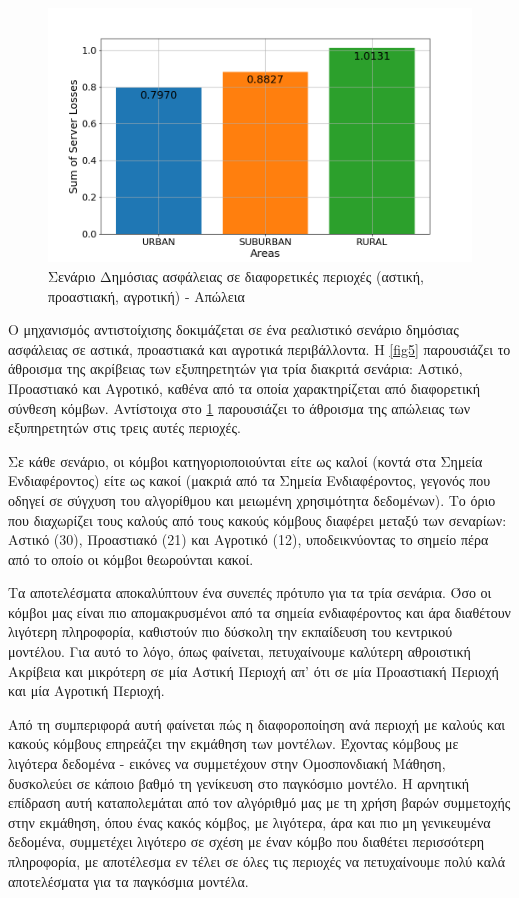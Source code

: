 \begin{figure}[H]
    \centering
    \includegraphics[width=\textwidth]{figures/chapter2/Sum_of_Losses_per_Area.png}
    \caption{Σενάριο Δημόσιας ασφάλειας σε διαφορετικές περιοχές (αστική, προαστιακή, αγροτική) - Απώλεια}
    \label{fig6}
\end{figure}

\newpage

Ο μηχανισμός αντιστοίχισης δοκιμάζεται σε ένα ρεαλιστικό σενάριο δημόσιας ασφάλειας σε αστικά, προαστιακά και αγροτικά περιβάλλοντα. Η \ref{fig5} παρουσιάζει το άθροισμα της ακρίβειας των εξυπηρετητών για τρία διακριτά σενάρια: Αστικό, Προαστιακό και Αγροτικό, καθένα από τα οποία χαρακτηρίζεται από διαφορετική σύνθεση κόμβων. Αντίστοιχα στο \ref{fig6} παρουσιάζει το άθροισμα της απώλειας των εξυπηρετητών στις τρεις αυτές περιοχές.

Σε κάθε σενάριο, οι κόμβοι κατηγοριοποιούνται είτε ως καλοί (κοντά στα Σημεία Ενδιαφέροντος) είτε ως κακοί (μακριά από τα Σημεία Ενδιαφέροντος, γεγονός που οδηγεί σε σύγχυση του αλγορίθμου και μειωμένη χρησιμότητα δεδομένων). Το όριο που διαχωρίζει τους καλούς από τους κακούς κόμβους διαφέρει μεταξύ των σεναρίων: Αστικό (30), Προαστιακό (21) και Αγροτικό (12), υποδεικνύοντας το σημείο πέρα από το οποίο οι κόμβοι θεωρούνται κακοί.

Τα αποτελέσματα αποκαλύπτουν ένα συνεπές πρότυπο για τα τρία σενάρια. Όσο οι κόμβοι μας είναι πιο απομακρυσμένοι από τα σημεία ενδιαφέροντος και άρα διαθέτουν λιγότερη πληροφορία, καθιστούν πιο δύσκολη την εκπαίδευση του κεντρικού μοντέλου. Για αυτό το λόγο, όπως φαίνεται, πετυχαίνουμε καλύτερη αθροιστική Ακρίβεια και μικρότερη σε μία Αστική Περιοχή απ' ότι σε μία Προαστιακή Περιοχή και μία Αγροτική Περιοχή. 

Από τη συμπεριφορά αυτή φαίνεται πώς η διαφοροποίηση ανά περιοχή με καλούς και κακούς κόμβους επηρεάζει την εκμάθηση των μοντέλων. Έχοντας κόμβους με λιγότερα δεδομένα - εικόνες να συμμετέχουν στην Ομοσπονδιακή Μάθηση, δυσκολεύει σε κάποιο βαθμό τη γενίκευση στο παγκόσμιο μοντέλο. Η αρνητική επίδραση αυτή καταπολεμάται από τον αλγόριθμό μας με τη χρήση βαρών συμμετοχής στην εκμάθηση, όπου ένας κακός κόμβος, με λιγότερα, άρα και πιο μη γενικευμένα δεδομένα, συμμετέχει λιγότερο σε σχέση με έναν κόμβο που διαθέτει περισσότερη πληροφορία, με αποτέλεσμα εν τέλει σε όλες τις περιοχές να πετυχαίνουμε πολύ καλά αποτελέσματα για τα παγκόσμια μοντέλα.
